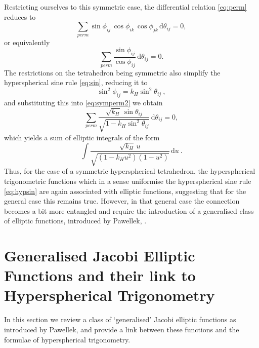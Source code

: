\documentclass[fleqn,11pt,twoside]{article}
\theoremstyle{definition}
\begin{document}
Restricting ourselves to this symmetric case, the differential relation \eqref{eq:perm} reduces to 
\begin{equation}\label{eq:symperm}
\sum_{perm} \sin\phi_{ij}\,\cos\phi_{ik}\,\cos\phi_{jk}\,\mathrm{d}\theta_{ij}=0, 
\end{equation}   
or equivalently 
\begin{equation}\label{eq:symperm2}
\sum_{perm} \frac{\sin\phi_{ij}}{\cos\phi_{ij}}\,\mathrm{d}\theta_{ij}=0.  
\end{equation} 
The restrictions on the tetrahedron being symmetric also simplify the hyperspherical sine rule 
\eqref{eq:sin}, reducing it to 
\begin{equation}\label{eq:redsin} 
\sin^2\phi_{ij}=k_H\sin^2\theta_{ij}\ , 
\end{equation} 
and substituting this into \eqref{eq:symperm2} we obtain 
\begin{equation}\label{eq:symperm3}
\sum_{perm} \frac{\sqrt{k_H}\,\sin\theta_{ij}}{\sqrt{1-k_H \sin^2\theta_{ij}}}\,\mathrm{d}\theta_{ij}=0,  
\end{equation} 
which yields a sum of elliptic integrals of the form 
\[ \int \frac{\sqrt{k_H}\,u}{\sqrt{(1-k_Hu^2)(1-u^2)}}\,\mathrm{d}u\ . \] 
Thus, for the case of a symmetric hyperspherical tetrahedron, the hyperspherical trigonometric functions 
which in a sense uniformise the hyperspherical sine rule \eqref{eq:hypsin} are again associated with elliptic 
functions, suggesting that for the general case this remains true. However, in that general case the 
connection becomes a bit more entangled and require the introduction of a generalised class of elliptic functions, 
introduced by Pawellek, \cite{pawellek}. 


\section{Generalised Jacobi Elliptic Functions and their link to Hyperspherical Trigonometry}

In this section we review a class of `generalised' Jacobi elliptic functions as introduced by Pawellek\cite{pawellek}, and provide a link between these functions and the formulae of hyperspherical trigonometry. 
\end{document}
